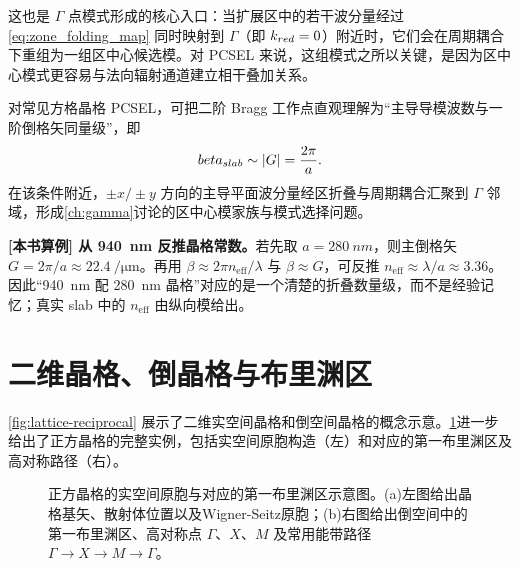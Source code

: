 这也是 $\Gamma$ 点模式形成的核心入口：当扩展区中的若干波分量经过 \cref{eq:zone_folding_map} 同时映射到 $\Gamma$（即 $k_{red}=0$）附近时，它们会在周期耦合下重组为一组区中心候选模。对 PCSEL 来说，这组模式之所以关键，是因为区中心模式更容易与法向辐射通道建立相干叠加关系。

对常见方格晶格 PCSEL，可把二阶 Bragg 工作点直观理解为“主导导模波数与一阶倒格矢同量级”，即
\begin{equation}
beta_{slab}\sim |G|=\frac{2\pi}{a}.
\label{eq:second_bragg_pcsel}
\end{equation}
在该条件附近，$\pm x/\pm y$ 方向的主导平面波分量经区折叠与周期耦合汇聚到 $\Gamma$ 邻域，形成\cref{ch:gamma}讨论的区中心模家族与模式选择问题。

\begin{ExampleBox}
\textbf{[本书算例] 从 \SI{940}{nm} 反推晶格常数。}若先取 $a=\SI{280}{nm}$，则主倒格矢 $G=2\pi/a\approx\SI{22.4}{\per\micro\meter}$。再用 $\beta\approx 2\pi n_{\mathrm{eff}}/\lambda$ 与 $\beta\approx G$，可反推 $n_{\mathrm{eff}}\approx\lambda/a\approx3.36$。因此“\SI{940}{nm} 配 \SI{280}{nm} 晶格”对应的是一个清楚的折叠数量级，而不是经验记忆；真实 slab 中的 $n_{\mathrm{eff}}$ 由纵向模给出。
\end{ExampleBox}

\section{二维晶格、倒晶格与布里渊区}
\cref{fig:lattice-reciprocal} 展示了二维实空间晶格和倒空间晶格的概念示意。\cref{fig:ch04_brillouin_zone}进一步给出了正方晶格的完整实例，包括实空间原胞构造（左）和对应的第一布里渊区及高对称路径（右）。
\begin{figure}[htbp]
  \centering
  
  \caption{正方晶格的实空间原胞与对应的第一布里渊区示意图。(a)左图给出晶格基矢、散射体位置以及Wigner-Seitz原胞；(b)右图给出倒空间中的第一布里渊区、高对称点 $\Gamma$、$X$、$M$ 及常用能带路径 $\Gamma\to X\to M\to\Gamma$。}
  \label{fig:ch04_brillouin_zone}
\end{figure}

